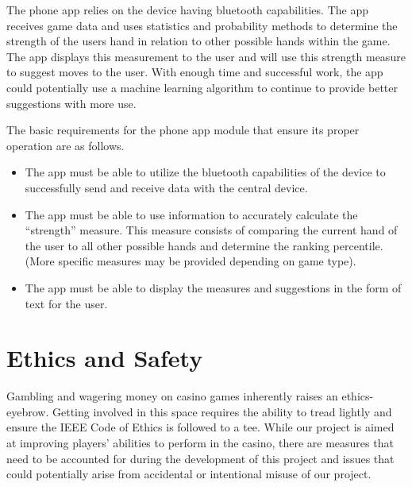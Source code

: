 \documentclass[12pt]{article}
\begin{document}
The phone app relies on the device having bluetooth capabilities. The app receives game data and uses statistics and probability methods to determine the strength of the users hand in relation to other possible hands within the game. The app displays this measurement to the user and will use this strength measure to suggest moves to the user. With enough time and successful work, the app could potentially use a machine learning algorithm to continue to provide better suggestions with more use. 

The basic requirements for the phone app module that ensure its proper operation are as follows.

\begin{itemize}
\item The app must be able to utilize the bluetooth capabilities of the device to successfully send and receive data with the central device.
\item The app must be able to use information to accurately calculate the ``strength'' measure. This measure consists of comparing the current hand of the user to all other possible hands and determine the ranking percentile. (More specific measures may be provided depending on game type).
\item The app must be able to display the measures and suggestions in the form of text for the user.
\end{itemize}

\section{Ethics and Safety}

Gambling and wagering money on casino games inherently raises an ethics-eyebrow. Getting involved in this space requires the ability to tread lightly and ensure the IEEE Code of Ethics \cite{IEEE_ethics} is followed to a tee. While our project is aimed at improving players' abilities to perform in the casino, there are measures that need to be accounted for during the development of this project and issues that could potentially arise from accidental or intentional misuse of our project. 
\end{document}
